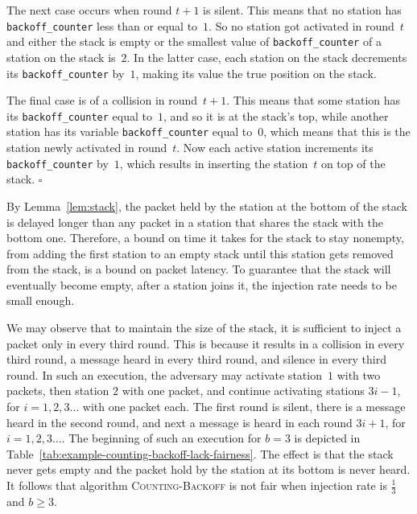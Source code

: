 \documentclass[11pt]{article}
\newcommand{\qed}{\hfill $\square$ \smallbreak}
\newenvironment{proof}{\noindent{\bf Proof:}}{\qed}
\begin{document}
\begin{proof}
The next case occurs when round $t+1$ is silent.
This means that no station has \texttt{backoff\_counter} less than or equal to~$1$.
So no station got activated in round~$t$ and either the stack is empty or the smallest value of  \texttt{backoff\_counter} of a station on the stack is~$2$. 
In the latter case,  each station on the stack decrements its \texttt{backoff\_counter} by~$1$, making its value the true position on the stack.

The final case is of a collision in round~$t+1$.
This means that some station has its \texttt{backoff\_counter} equal to~$1$, and so it is at the stack's top, while another station has its variable \texttt{backoff\_counter} equal to~$0$, which means that this is the station newly activated in round~$t$.
Now each active station increments its \texttt{backoff\_counter} by~$1$, which results in inserting the station~$t$ on top of the stack.
\end{proof} 

By Lemma~\ref{lem:stack}, the packet held by the station at the bottom of the stack is delayed longer than any packet in a station that shares the stack with the bottom one.
Therefore, a bound on time it takes for the stack to stay nonempty, from adding the first station to an empty stack until this station gets removed from the stack, is a bound on packet latency.
To guarantee that the stack will eventually become empty, after a station joins it, the injection rate needs to be small enough.

We may observe that to maintain the size of the stack, it is sufficient to inject a packet only in every third round.
This is because it results in a collision in every third round, a message heard in every third round, and silence in every third round.
In such an execution, the adversary may activate station~$1$ with two packets, then station $2$ with one packet, and continue activating stations $3i-1$, for $i=1,2,3\ldots$ with one packet each.
The first round is silent, there is a message heard in the second round, and next a message is heard in each round  $3i+1$, for $i=1,2,3\ldots$.
The beginning of such an execution for $b=3$ is depicted in Table~\ref{tab:example-counting-backoff-lack-fairness}.
The effect is that the stack never gets empty and the packet hold by the station at its bottom is never heard. 
It follows that algorithm \textsc{Counting-Backoff} is not fair when injection rate is $\frac{1}{3}$ and $b\ge 3$.
\end{document}
